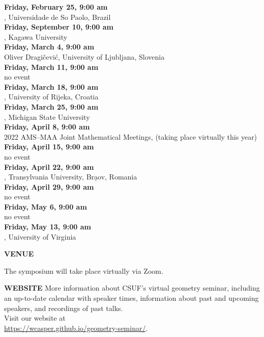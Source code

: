\documentclass[a4paper]{article}
\begin{document}
\begin{minipage}{0.95\textwidth}
\begin{minipage}[b]{0.47\textwidth}
{\leavevmode \raggedright
\textbf{\color{cprimary}Friday, February 25, 9:00 am}\\ , Universidade de So Paolo, Brazil\\
\textbf{\color{cprimary}Friday, September 10, 9:00 am}\\ , Kagawa University\\
\textbf{\color{cprimary} Friday, March 4, 9:00 am}\\ Oliver Dragi\v{c}evi\'{c}, University of Ljubljana, Slovenia\\
\textbf{\color{cprimary} Friday, March 11, 9:00 am}\\ no event\\
\textbf{\color{cprimary} Friday, March 18, 9:00 am}\\ , University of Rijeka, Croatia\\
\textbf{\color{cprimary} Friday, March 25, 9:00 am}\\ , Michigan State University\\
\textbf{\color{cprimary} Friday, April 8, 9:00 am}\\ 2022 AMS--MAA Joint Mathematical Meetings, (taking place virtually this year)\\
\textbf{\color{cprimary} Friday, April 15, 9:00 am}\\ no event\\
\textbf{\color{cprimary} Friday, April 22, 9:00 am}\\ , Transylvania University, Br\d{a}ov, Romania\\
\textbf{\color{cprimary} Friday, April 29, 9:00 am}\\ no event\\
\textbf{\color{cprimary} Friday, May 6, 9:00 am}\\ no event\\
\textbf{\color{cprimary} Friday, May 13, 9:00 am}\\ , University of Virginia\\
\par{}
}

\vspace{0.5in}
\medskip

\large{\color{csecondary}\textbf{VENUE}}

The symposium will take place virtually via Zoom.

\medskip

\large{\color{csecondary}\textbf{WEBSITE}}
More information about CSUF's virtual geometry seminar, including an up-to-date calendar with speaker times, information about past and upcoming speakers, and recordings of past talks.\\
Visit our website at\\ \href{https://wcasper.github.io/geometry-seminar/}{https://wcasper.github.io/geometry-seminar/}.


\end{minipage}
\end{minipage}
\end{document}
